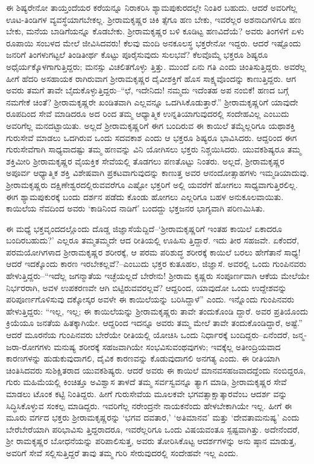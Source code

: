 ಈ ಶಿಷ್ಯರೇನೋ ತಾಯ್ತಂದೆಯರ ಕರೆಯನ್ನೂ ನಿರಾಕರಿಸಿ ಶ್ಯಾಮಪುಕುರದಲ್ಲೇ ನಿಂತಿರ ಬಹುದು. ಆದರೆ ಅವರಿಗೆಲ್ಲ ಊಟ-ತಿಂಡಿಗಳ ವ್ಯವಸ್ಥೆಯಾಗಬೇಕಲ್ಲ. ಶ್ರೀರಾಮಕೃಷ್ಣರ ಚಿಕಿ ತ್ಸೆಗೂ ಹಣ ಬೇಕು, ಇವರೆಲ್ಲರ ಅಶನಾದಿಗಳಿಗೂ ಹಣ ಬೇಕು, ಮನೆಯ ಬಾಡಿಗೆಯನ್ನೂ ಕೊಡಬೇಕು. ಶ್ರೀರಾಮಕೃಷ್ಣರ ಬಳಿ ಕೂಡಿಟ್ಟ ಹಣವಿದೆಯೆ? ಅವರು ತಿಂಗಳಿಗೆ ಏಳು ರೂಪಾಯಿ ಸಂಬಳದ ಮೇಲೆ ಜೀವಿಸಿದವರು! ಕೆಲವು ಮಂದಿ ಅನಕೂಲಸ್ಥ ಭಕ್ತರೇನೋ ಇದ್ದರು. ಆದರೆ ಇಷ್ಟೊಂದು ಜನರಿಗೆ ತಿಂಗಳುಗಟ್ಟಲೆ ತಿಂಡಿತೀರ್ಥ ಕೊಟ್ಟು ಪೂರೈಸುವುದು ಸುಲಭವೆ? ಕೆಲವೊಮ್ಮೆ ಭಕ್ತರೂ ಶಿಷ್ಯರೂ ಅಧೈರ್ಯಕ್ಕೊಳಗಾಗುತ್ತಿದ್ದರು; ಮನಸ್ಸು ವಿಚಲಿತಗೊಳ್ಳು ತ್ತಿತ್ತು. ಮುಂದೆ ಏನು ಗತಿ ಎಂದು ಚಿಂತಿಸುತ್ತಿದ್ದರು. ಅವರೆಲ್ಲ ಹೀಗೆ ಹೆದರಿ ಅಸಹಾಯಕ ರಾಗಿರುವಾಗ ಶ್ರೀರಾಮಕೃಷ್ಣರ ದೈವೀಶಕ್ತಿಗೆ ಹೊಸ ಸಾಕ್ಷ್ಯವೊಂದನ್ನು ಕಾಣುತ್ತಿದ್ದರು. ಆಗ ಅವರು ತಮಗೆ ತಾವೇ ಬೈದುಕೊಳ್ಳುತ್ತಿದ್ದರು–“ಛೆ, ಇದೇನಿದು! ನಮ್ಮದು ಇದೆಂತಹ ಅಪ ನಂಬಿಕೆ! ಹಣದ ಬಗ್ಗೆ ನಮಗೇಕೆ ಚಿಂತೆ? ಶ್ರೀರಾಮಕೃಷ್ಣರೇ ಖಂಡಿತವಾಗಿ ಎಲ್ಲವನ್ನೂ ಒದಗಿಸಿಕೊಡುತ್ತಾರೆ.” ಶ್ರೀರಾಮಕೃಷ್ಣರಿಗೆ ಯಾವುದೇ ರೂಪದಿಂದ ಸೇವೆ ಮಾಡಿದರೂ ಅದ ರಿಂದ ತಮ್ಮ ಆಧ್ಯಾತ್ಮಿಕ ಉನ್ನತಿಯಾಗುವುದರಲ್ಲಿ ಸಂದೇಹವಿಲ್ಲ ಎಂಬುದು ಅವರಿಗೆಲ್ಲ ಮನದಟ್ಟಾಯಿತು. ಅಲ್ಲದೆ ಶ್ರೀರಾಮಕೃಷ್ಣರಿಗೆ ಈಗ ಬಂದಿರುವ ಈ ಕಾಯಿಲೆ ತಮ್ಮೆಲ್ಲರಿಗೂ ಯಥಾಶಕ್ತಿ ಗುರುಸೇವೆ ಮಾಡಲು ಒದಗಿರುವ ಒಂದು ಸದವಕಾಶ ಎಂದು ಆ ಭಕ್ತರೂ ಶಿಷ್ಯರೂ ಭಾವಿಸಿದರು. ಆದ್ದರಿಂದ ಈಗ ಗುರುಸೇವೆಗಾಗಿ ಸಾಧ್ಯವಾದಷ್ಟು ತಮ್ಮ ಹಣವನ್ನು ವಿನಿ ಯೋಗಿಸಲು ಭಕ್ತರು ನಿಶ್ಚಯಿಸಿದರು. ಯುವಕಶಿಷ್ಯರೂ ತಮ್ಮ ಶಕ್ತಿಮೀರಿ ಶ್ರೀರಾಮಕೃಷ್ಣರ ವೈಯಕ್ತಿಕ ಸೇವೆಯಲ್ಲಿ ತೊಡಗಲು ಪಣತೊಟ್ಟು ನಿಂತರು. ಅಲ್ಲದೆ, ಶ್ರೀರಾಮಕೃಷ್ಣರ ಅಪೂರ್ವ ಆಧ್ಯಾತ್ಮಿಕ ಶಕ್ತಿ ವಿಶೇಷವಾಗಿ ಪ್ರಕಟವಾಗುವುದನ್ನು ಕಾಣುತ್ತ ಅವರ ಆನಂದೋತ್ಸಾಹಗಳು ಇಮ್ಮಡಿಯಾದುವು. ಶ್ರೀರಾಮಕೃಷ್ಣರು ದಕ್ಷಿಣೇಶ್ವರದಲ್ಲಿರುವವರೆಗೂ ಎಷ್ಟೋ ಭಕ್ತರಿಗೆ ಅಲ್ಲಿ ಯವರೆಗೆ ಹೋಗಲು ಸಾಧ್ಯವಾಗುತ್ತಿರಲಿಲ್ಲ. ಈಗ ಶ್ಯಾಮಪುಕುರಕ್ಕೆ ಬಂದು ದರ್ಶನ ಪಡೆದು ಕೊಂಡು ಹೋಗಲು ಎಲ್ಲರಿಗೂ ಬಹಳ ಅನುಕೂಲವಾಯಿತು. ಕಾಯಿಲೆಯ ನೆವದಿಂದ ಅವರು ‘ಕಾಡಿನಿಂದ ನಾಡಿಗೆ’ ಬಂದದ್ದು ಭಕ್ತಜನರ ಭಾಗ್ಯವಾಗಿ ಪರಿಣಮಿಸಿತು.

ಈ ಮಧ್ಯೆ ಭಕ್ತವೃಂದದಲ್ಲೊಂದು ದೊಡ್ಡ ಜಿಜ್ಞಾಸೆಯೆದ್ದಿದೆ–‘ಶ್ರೀರಾಮಕೃಷ್ಣರಿಗೆ ಇಂತಹ ಕಾಯಿಲೆ ಏಕಾದರೂ ಬಂದಿರಬಹುದು?’ ಎಲ್ಲರೂ ತಮ್ಮತಮ್ಮದೇ ಆದ ರೀತಿಯಲ್ಲಿ ಊಹಿಸು ತ್ತಿದ್ದಾರೆ. ಇದು ತೀರ ಸಹಜವೇ. ಏಕೆಂದರೆ, ಪರಮಯೋಗಿಗಳಾದ ಶ್ರೀರಾಮಕೃಷ್ಣರ ಶರೀರಕ್ಕೆ, ಆ ಪರಮ ಪರಿಶುದ್ಧ ಶರೀರಕ್ಕೆ ಕಾಯಿಲೆ ಬರಲು ಹೇಗೆತಾನೆ ಸಾಧ್ಯ! ಆದರೆ ಇದಕ್ಕೊಂದು ಕಾರಣ ಇರಬೇಕಲ್ಲವೆ?–ಎಂಬುದು ಭಕ್ತರ ಕುತೂಹಲ, ಜಿಜ್ಞಾಸೆ. ಅವರಲ್ಲಿ ಒಂದು ಗುಂಪಿನವರು ಹೇಳುತ್ತಿದ್ದರು–“ಇದೆಲ್ಲ ಜಗನ್ಮಾತೆಯ ಇಚ್ಛೆಯಲ್ಲದೆ ಬೇರೇನು! ಶ್ರೀರಾಮ ಕೃಷ್ಣರು ಸಂಪೂರ್ಣವಾಗಿ ಆಕೆಯ ಮೇಲೆಯೇ ನಿರ್ಭರರಾಗಿ, ಅವಳ ಉಪಕರಣವೇ ಆಗಿ ಬಿಟ್ಟಿರುವವರಲ್ಲವೆ? ಆದ್ದರಿಂದ, ಯಾವುದೋ ಒಂದು ಉದ್ದೇಶವನ್ನು ಪರಿಪೂರ್ಣಗೊಳಿಸುವು ದಕ್ಕೋಸ್ಕರ ಅವಳೇ ಈ ಕಾಯಿಲೆಯನ್ನು ಬರಿಸಿದ್ದಾಳೆ” ಎಂದು. ಇನ್ನೊಂದು ಗುಂಪಿನವರು ಹೇಳುತ್ತಿದ್ದರು: “ಇಲ್ಲ, ಇಲ್ಲ; ಈ ಕಾಯಿಲೆಯನ್ನು ಶ್ರೀರಾಮಕೃಷ್ಣರು ತಾವೇ ತಂದುಕೊಂಡಿ ದ್ದಾರೆ. ಅವರ ಪ್ರತಿಯೊಂದು ಕ್ರಿಯೆಯೂ ಜನತೆಯ ಹಿತಕ್ಕಾಗಿಯೇ. ಆದ್ದರಿಂದ ಇದನ್ನೂ ಅವರು ತಮ್ಮ ಮೇಲೆ ತಾವೇ ತಂದುಕೊಂಡಿದ್ದಾರೆ, ಅಷ್ಟೆ.” ಆದರೆ ಮೂರನೆಯ ಗುಂಪಿನವರು ಬೇರೆಯೇ ರೀತಿಯಲ್ಲಿ ಯೋಚಿಸಿ ಒಂದು ನಿರ್ಧಾರಕ್ಕೆ ಬಂದಿದ್ದರು–ಏನೆಂದರೆ, ಜನ್ಮ- ಜರಾ-ರೋಗಗಳು ಮನುಷ್ಯ ಶರೀರಕ್ಕೆ ಸಹಜವಾಗಿಯೇ ಸಂಭವಿಸುವಂಥವುಗಳು; ಇವಕ್ಕೆಲ್ಲ ಅತೀಂದ್ರಿಯವಾದ ಕಾರಣಗಳನ್ನು ಹುಡುಕುವುದಾಗಲಿ, ದೈವಿಕ ಕಾರಣವನ್ನು ಕೊಡುವುದಾಗಲಿ ಅನಗತ್ಯ ಎಂದು. ಈ ರೀತಿಯಾಗಿ ಚಿಂತಿಸಿದವರು ಸುಶಿಕ್ಷಿತರಾದ ಯುವಕಶಿಷ್ಯರು. ಆದರೆ ಅವರು ಈ ಕಾಯಿಲೆ ಮಾನವಸಹಜವಾದದ್ದೆಂದು ನಂಬಿದ್ದರೂ, ಗುರು ಮಹಿಮೆಯಲ್ಲಿ ಕಿಂಚಿತ್ತೂ ಅವಿಶ್ವಾಸ ತಾಳದೆ ತಮ್ಮ ಸರ್ವಸ್ವವನ್ನೂ ತ್ಯಾಗ ಮಾಡಿ, ಶ್ರೀರಾಮಕೃಷ್ಣರ ಸೇವೆ ಮಾಡಲು ಟೊಂಕ ಕಟ್ಟಿ ನಿಂತಿದ್ದರು. ಹೀಗೆ ಗುರುಸೇವೆಯ ಮೂಲಕವೇ ಭಗವತ್ಸಾಕ್ಷಾತ್ಕಾರವೆಂಬ ಆದರ್ಶ ವನ್ನು ಸಿದ್ಧಿಸಿಕೊಳ್ಳುವ ಸಂಕಲ್ಪ ಮಾಡಿದ್ದರು. ಇವರಿಗೆಲ್ಲ ನರೇಂದ್ರನೇ ನಾಯಕನೆಂದು ಹೇಳಬೇಕಾಗಿಯೇ ಇಲ್ಲ. ಹೀಗೆ ಈ ಮೂರು ವರ್ಗದ ಭಕ್ತರು ಶ್ರೀರಾಮಕೃಷ್ಣರನ್ನು ‘ಭಗವ ದವತಾರ,’ ‘ಅತಿಮಾನವ’ ಮತ್ತು ‘ದೇವತಾಮನುಷ್ಯ’ ಎಂದು ಬೇರೆಬೇರೆಯಾಗಿ ಪರಿಭಾವಿಸು ತ್ತಿದ್ದರಾದರೂ, ಇವರೆಲ್ಲರಿಗೂ ಒಂದು ವಿಷಯವಂತೂ ಸ್ಪಷ್ಟವಾಗಿತ್ತು. ಅದೇನೆಂದರೆ, ಶ್ರೀ ರಾಮಕೃಷ್ಣರ ಬೋಧನೆಯನ್ನು ಪರಿಪಾಲಿಸುತ್ತ, ಅವರು ತೋರಿಸಿಕೊಟ್ಟ ಆದರ್ಶಗಳನ್ನು ಅನು ಷ್ಠಾನ ಮಾಡುತ್ತ, ಅವರಿಗೆ ಸೇವೆ ಸಲ್ಲಿಸುತ್ತಿದ್ದರೆ ತಾವು ತಮ್ಮ ಗುರಿ ಸೇರುವುದರಲ್ಲಿ ಸಂದೇಹವೇ ಇಲ್ಲ ಎಂದು. 

